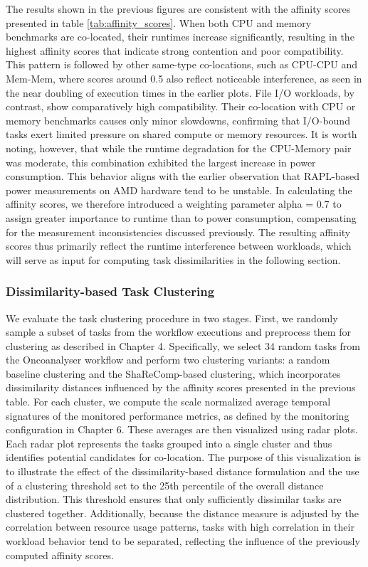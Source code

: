 The results shown in the previous figures are consistent with the affinity scores presented in table \ref{tab:affinity_scores}. When both CPU and memory benchmarks are co-located, their runtimes increase significantly, resulting in the highest affinity scores that indicate strong contention and poor compatibility. This pattern is followed by other same-type co-locations, such as CPU-CPU and Mem-Mem, where scores around 0.5 also reflect noticeable interference, as seen in the near doubling of execution times in the earlier plots. File I/O workloads, by contrast, show comparatively high compatibility. Their co-location with CPU or memory benchmarks causes only minor slowdowns, confirming that I/O-bound tasks exert limited pressure on shared compute or memory resources.
It is worth noting, however, that while the runtime degradation for the CPU-Memory pair was moderate, this combination exhibited the largest increase in power consumption. This behavior aligns with the earlier observation that RAPL-based power measurements on AMD hardware tend to be unstable. In calculating the affinity scores, we therefore introduced a weighting parameter alpha = 0.7 to assign greater importance to runtime than to power consumption, compensating for the measurement inconsistencies discussed previously. The resulting affinity scores thus primarily reflect the runtime interference between workloads, which will serve as input for computing task dissimilarities in the following section.

\subsubsection{Dissimilarity-based Task Clustering}
\label{sec:evaluation_task_consolidation}
We evaluate the task clustering procedure in two stages. First, we randomly sample a subset of tasks from the workflow executions and preprocess them for clustering as described in Chapter 4. Specifically, we select 34 random tasks from the Oncoanalyser workflow and perform two clustering variants: a random baseline clustering and the ShaReComp-based clustering, which incorporates dissimilarity distances influenced by the affinity scores presented in the previous table.
For each cluster, we compute the scale normalized average temporal signatures of the monitored performance metrics, as defined by the monitoring configuration in Chapter 6. These averages are then visualized using radar plots. Each radar plot represents the tasks grouped into a single cluster and thus identifies potential candidates for co-location. The purpose of this visualization is to illustrate the effect of the dissimilarity-based distance formulation and the use of a clustering threshold set to the 25th percentile of the overall distance distribution. This threshold ensures that only sufficiently dissimilar tasks are clustered together.
Additionally, because the distance measure is adjusted by the correlation between resource usage patterns, tasks with high correlation in their workload behavior tend to be separated, reflecting the influence of the previously computed affinity scores.

